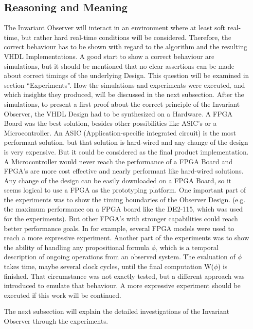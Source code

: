 \subsection{Reasoning and Meaning}
\label{chapter:4:section:1:subsection:1}
The Invariant Observer will interact in an environment where at least soft real-time, but rather hard real-time conditions will be considered.
Therefore, the correct behaviour has to be shown with regard to the algorithm and the resulting VHDL Implementations.
A good start to show a correct behaviour are simulations, but it should be mentioned that no clear assertions can be made about correct timings of the underlying Design.
This question will be examined in section ``Experiments''.
How the simulations and experiments were executed, and which insights they produced, will be discussed in the next subsection.
After the simulations, to present a first proof about the correct principle of the Invariant Observer, the VHDL Design had to be synthesized on a Hardware.
A FPGA Board was the best solution, besides other possibilities like ASIC's or a Microcontroller. 
An ASIC (Application-specific integrated circuit) is the most performant solution, but that solution is hard-wired and any change of the design is very expensive. 
But it could be considered as the final product implementation.
A Microcontroller would never reach the performance of a FPGA Board and FPGA's are more cost effective and nearly performant like hard-wired solutions. 
Any change of the design can be easily downloaded on a FPGA Board, so it seems logical to use a FPGA as the prototyping platform.
One important part of the experiments was to show the timing boundaries of the Observer Design. 
(e.g. the maximum performance on a FPGA board like the DE2-115, which was used for the experiments).
But other FPGA's with stronger capabilities could reach better performance goals. 
In \cite{RTFMBJ13} for example, several FPGA models were used to reach a more expressive experiment.    
Another part of the experiments was to show the ability of handling any propositional formula $\phi$, 
which is a temporal description of ongoing operations from an observed system. 
The evaluation of $\phi$ takes time, maybe several clock cycles, until the final computation W($\phi$) is finished. 
That circumstance was not exactly tested, but a different approach was introduced to emulate that behaviour. 
A more expressive experiment should be executed if this work will be continued.

The next subsection will explain the detailed investigations of the Invariant Observer through the experiments.   

